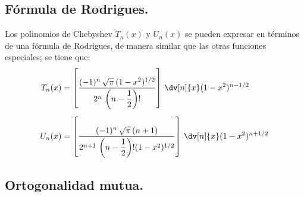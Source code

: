 \subsection{Fórmula de Rodrigues.}

Los polinomios de Chebyshev $T_{n}(x)$ y $U_{n}(x)$ se pueden expresar en términos de una fórmula de Rodrigues, de manera similar que las otras funciones especiales; se tiene que:
\begin{align*}
T_{n}(x) &= \left[ \dfrac{(-1)^{n} \, \sqrt{\pi} \, (1 - x^{2})^{1/2}}{2^{n} \, \left( n - \dfrac{1}{2} \right)!} \right] \, \dv[n]{x} (1 - x^{2})^{n-1/2} \\[0.5em]
U_{n}(x) &= \left[ \dfrac{(-1)^{n} \, \sqrt{\pi} \, (n+1)}{2^{n+1} \, \left( n - \dfrac{1}{2} \right)! (1 - x^{2})^{1/2}} \right] \, \dv[n]{x} (1 - x^{2})^{n+1/2}
\end{align*}

\subsection{Ortogonalidad mutua.}

